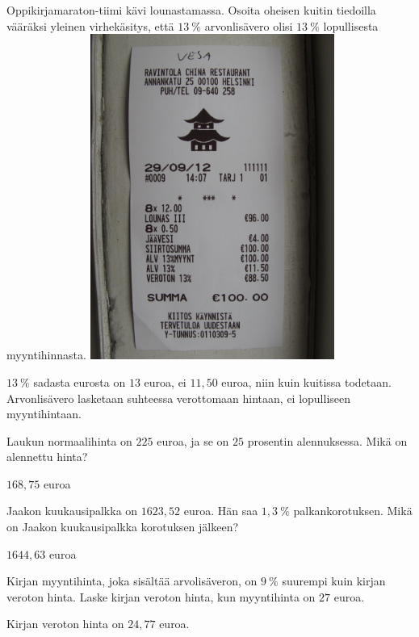 \begin{tehtavasivu}
\begin{tehtava}
    Oppikirjamaraton-tiimi kävi lounastamassa. Osoita oheisen kuitin tiedoilla vääräksi yleinen virhekäsitys,
    että $13~\%$ arvonlisävero olisi $13~\%$ lopullisesta myyntihinnasta.
    \includegraphics[width=80mm, angle=270]{pictures/alv-kuitti}
    \begin{vastaus}
         $13~\%$ sadasta eurosta on $13$ euroa, ei $11,50$ euroa, niin kuin kuitissa todetaan. Arvonlisävero
         lasketaan suhteessa verottomaan hintaan, ei lopulliseen myyntihintaan.
    \end{vastaus}
\end{tehtava}

\begin{tehtava}
    Laukun normaalihinta on $225$ euroa, ja se on $25$ prosentin alennuksessa.
    Mikä on alennettu hinta?
    \begin{vastaus}
        $168,75$ euroa
    \end{vastaus}
\end{tehtava}

\begin{tehtava}
    Jaakon kuukausipalkka on $1623,52$ euroa. Hän saa $1,3~\%$ palkankorotuksen.
    Mikä on Jaakon kuukausipalkka korotuksen jälkeen?
    \begin{vastaus}
        $1644,63$ euroa
    \end{vastaus}
\end{tehtava}

\begin{tehtava}
    Kirjan myyntihinta, joka sisältää arvolisäveron, on $9~\%$ suurempi kuin kirjan veroton hinta.
    Laske kirjan veroton hinta, kun myyntihinta on $27$ euroa.
    \begin{vastaus}
        Kirjan veroton hinta on $24,77$ euroa.
    \end{vastaus}
\end{tehtava}


\end{tehtavasivu}
